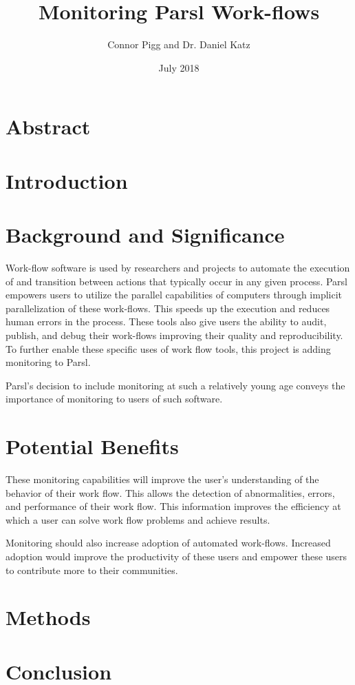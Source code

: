 \documentclass{article}
\title{Monitoring Parsl Work-flows}
\author{Connor Pigg and Dr. Daniel Katz}
\date{July 2018}
\begin{document}
\maketitle

\section{Abstract}

\pagebreak

\section{Introduction}


\section{Background and Significance}
Work-flow software is used by researchers and projects to automate the execution of and transition between actions that typically occur in any given process.
Parsl empowers users to utilize the parallel capabilities of computers through implicit parallelization of these work-flows.
This speeds up the execution and reduces human errors in the process.
These tools also give users the ability to audit, publish, and debug their work-flows improving their quality and reproducibility.
To further enable these specific uses of work flow tools, this project is adding monitoring to Parsl.

Parsl's decision to include monitoring at such a relatively young age conveys the importance of monitoring to users of such software.

\section{Potential Benefits}
These monitoring capabilities will improve the user's understanding of the behavior of their work flow.
This allows the detection of abnormalities, errors, and performance of their work flow.
This information improves the efficiency at which a user can solve work flow problems and achieve results.

Monitoring should also increase adoption of automated work-flows.
Increased adoption would improve the productivity of these users and empower these users to contribute more to their communities.

\section{Methods}


\section{Conclusion}




\end{document}
